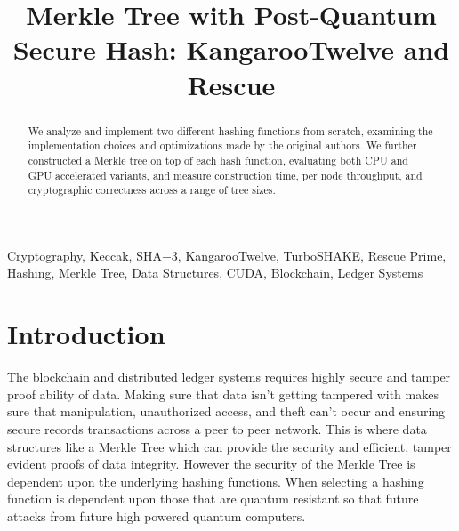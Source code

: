 \documentclass[conference]{IEEEtran}
\begin{document}
\title{Merkle Tree with Post-Quantum Secure Hash:
KangarooTwelve and Rescue\\
}

\author{
\and
{}
}

\maketitle

\begin{abstract}
We analyze and implement two different hashing functions from scratch, examining the implementation choices and optimizations made by the original authors. We further constructed a Merkle tree on top of each hash function, evaluating both CPU and GPU accelerated variants, and measure construction time, per node throughput, and cryptographic correctness across a range of tree sizes.

\end{abstract}

\begin{IEEEkeywords}
Cryptography, Keccak, SHA$-$3, KangarooTwelve, TurboSHAKE, Rescue Prime, Hashing, Merkle Tree, Data Structures, CUDA, Blockchain, Ledger Systems

\end{IEEEkeywords}

\section{Introduction}

The blockchain and distributed ledger systems requires highly secure and tamper proof ability of data. Making sure that data isn't getting tampered with makes sure that manipulation, unauthorized access, and theft can't occur and ensuring secure records transactions across a peer to peer network. This is where data structures like a Merkle Tree which can provide the security and  efficient, tamper evident proofs of data integrity. However the security of the Merkle Tree is dependent upon the underlying hashing functions. When selecting a hashing function is dependent upon those that are quantum resistant so that future attacks from future high powered quantum computers.
\end{document}
